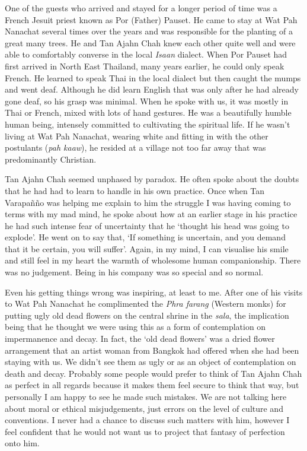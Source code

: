 One of the guests who arrived and stayed for a longer period of time was
a French Jesuit priest known as Por (Father) Pauset. He came to stay at
Wat Pah Nanachat several times over the years and was responsible for
the planting of a great many trees. He and Tan Ajahn Chah knew each
other quite well and were able to comfortably converse in the local
\emph{Isaan} dialect. When Por Pauset had first arrived in North East
Thailand, many years earlier, he could only speak French. He learned to
speak Thai in the local dialect but then caught the mumps and went deaf.
Although he did learn English that was only after he had already gone
deaf, so his grasp was minimal. When he spoke with us, it was mostly in
Thai or French, mixed with lots of hand gestures. He was a beautifully
humble human being, intensely committed to cultivating the spiritual
life. If he wasn't living at Wat Pah Nanachat, wearing white and fitting
in with the other postulants (\emph{pah kaaw}), he resided at a village
not too far away that was predominantly Christian.

Tan Ajahn Chah seemed unphased by paradox. He often spoke about the
doubts that he had had to learn to handle in his own practice. Once when
Tan Varapañño was helping me explain to him the struggle I was having
coming to terms with my mad mind, he spoke about how at an earlier stage
in his practice he had such intense fear of uncertainty that he `thought
his head was going to explode'. He went on to say that, `If something is
uncertain, and you demand that it be certain, you will suffer'. Again,
in my mind, I can visualise his smile and still feel in my heart the
warmth of wholesome human companionship. There was no judgement. Being
in his company was so special and so normal.

Even his getting things wrong was inspiring, at least to me. After one
of his visits to Wat Pah Nanachat he complimented the \emph{Phra farang}
(Western monks) for putting ugly old dead flowers on the central shrine
in the \emph{sala}, the implication being that he thought we were using
this as a form of contemplation on impermanence and decay. In fact, the
`old dead flowers' was a dried flower arrangement that an artist woman
from Bangkok had offered when she had been staying with us. We didn't
see them as ugly or as an object of contemplation on death and decay.
Probably some people would prefer to think of Tan Ajahn Chah as perfect
in all regards because it makes them feel secure to think that way, but
personally I am happy to see he made such mistakes. We are not talking
here about moral or ethical misjudgements, just errors on the level of
culture and conventions. I never had a chance to discuss such matters
with him, however I feel confident that he would not want us to project
that fantasy of perfection onto him.

